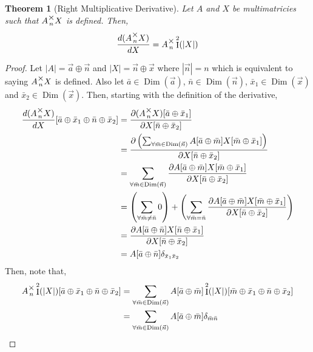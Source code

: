 \documentclass[12pt]{book}
\theoremstyle{plain}
\newtheorem{theorem}{Theorem}[chapter]
\theoremstyle{definition}
\theoremstyle{ppart}
\theoremstyle{case}
\theoremstyle{solution}
\DeclareMathOperator{\Dim}{Dim}
\DeclareMathOperator{\Ident}{I}
\newcommand{\mmult}[1]{\text{\raisebox{1ex}{$\underset{#1}{\times}$}}}
\newcommand{\shape}[1]{\left|#1\right|}
\begin{document}
\begin{theorem}[Right Multiplicative Derivative]
\label{right_mult_derivative}
Let $A$ and $X$ be multimatricies such that $A \mmult{n} X$ is
defined. Then,
\[ \frac{d(A \mmult{n} X)}{dX} = A \mmult{n} \Ident^2(\shape{X}) \]
\end{theorem}
\begin{proof}
Let $\shape{A} = \vec{a} \oplus \vec{n}$ and $\shape{X} = \vec{n} \oplus \vec{x}$
where $\shape{\vec{n}} = n$ which is equivalent to saying $A \mmult{n} X$ is defined.
Also let $\bar{a} \in \Dim(\vec{a})$, $\bar{n} \in \Dim(\vec{n})$,
$\bar{x}_1 \in \Dim(\vec{x})$ and $\bar{x}_2 \in \Dim(\vec{x})$.
Then, starting with the definition of the derivative,
\begin{align*}
  \frac{d(A\mmult{n}X)}{dX}[\bar{a} \oplus \bar{x}_1 \oplus \bar{n} \oplus \bar{x}_2]
  &=
  \frac{
    \partial (A \mmult{n} X)[\bar{a} \oplus \bar{x}_1]
  }{
    \partial X[\bar{n} \oplus \bar{x}_2]
  } \\
  &=
  \frac{
    \partial \left(
      \sum_{\forall \bar{m} \in \Dim(\vec{n})}
        A[\bar{a} \oplus \bar{m}]
        X[\bar{m} \oplus \bar{x}_1]
    \right)
  }{
    \partial X[\bar{n} \oplus \bar{x}_2]
  } \\
  &=
  \sum_{\forall \bar{m} \in \Dim(\vec{n})}
    \frac{
      \partial 
      A[\bar{a} \oplus \bar{m}]
      X[\bar{m} \oplus \bar{x}_1]
    }{
      \partial X[\bar{n} \oplus \bar{x}_2]
    } \\
  &=
  \left(
    \sum_{\forall \bar{m} \ne \bar{n}} 0
  \right)
  +
  \left(
    \sum_{\forall \bar{m} = \bar{n}}
    \frac{
      \partial 
      A[\bar{a} \oplus \bar{m}]
      X[\bar{m} \oplus \bar{x}_1]
    }{
      \partial X[\bar{n} \oplus \bar{x}_2]
    }
  \right) \\
  &=
  \frac{
    \partial 
    A[\bar{a} \oplus \bar{n}]
    X[\bar{n} \oplus \bar{x}_1]
  }{
    \partial X[\bar{n} \oplus \bar{x}_2]
  } \\
  &= A[\bar{a} \oplus \bar{n}] \delta_{\bar{x}_1 \bar{x}_2}
\end{align*}
Then, note that,
\begin{align*}
  A \mmult{n} \Ident^2(\shape{X})[\bar{a} \oplus \bar{x}_1 \oplus \bar{n} \oplus \bar{x}_2]
  &=
  \sum_{\forall \bar{m} \in \Dim(\vec{n})}
  A[\bar{a} \oplus \bar{m}]
  \Ident^2(\shape{X})[\bar{m} \oplus \bar{x}_1 \oplus \bar{n} \oplus \bar{x}_2] \\
  &=
  \sum_{\forall \bar{m} \in \Dim(\vec{n})}
  A[\bar{a} \oplus \bar{m}]
  \delta_{\bar{m} \bar{n}}

\end{align*}
\end{proof}
\end{document}
